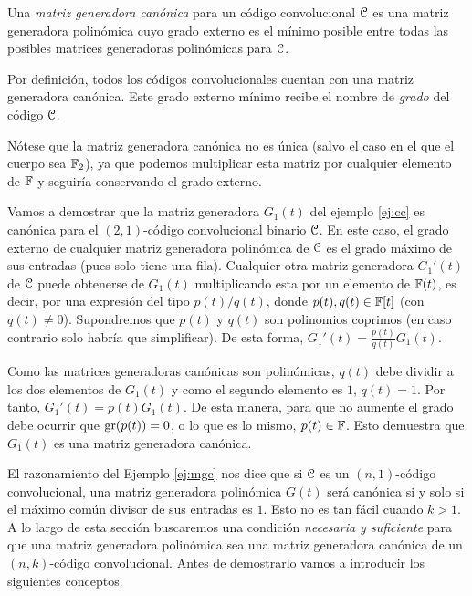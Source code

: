 \begin{definicion}
Una \emph{matriz generadora canónica} para un código convolucional $\mathcal C$ es una matriz generadora polinómica cuyo grado externo es el mínimo posible entre todas las posibles matrices generadoras polinómicas para $\mathcal C$.
\end{definicion}


Por definición, todos los códigos convolucionales cuentan con una matriz generadora canónica. Este grado externo mínimo recibe el nombre de \emph{grado} del código $\mathcal C$.

Nótese que la matriz generadora canónica no es única (salvo el caso en el que el cuerpo sea $\mathbb{F}_2$), ya que podemos multiplicar esta matriz por cualquier elemento de $\mathbb{F}$ y seguiría conservando el grado externo.

\begin{ejemplo}
\label{ej:mgc}
Vamos a demostrar que la matriz generadora $G_1(t)$ del ejemplo \ref{ej:cc} es canónica para el $(2,1)$-código convolucional binario $\mathcal C$. En este caso, el grado externo de cualquier matriz generadora polinómica de $\mathcal C$ es el grado máximo de sus entradas (pues solo tiene una fila). Cualquier otra matriz generadora $G_1'(t)$ de $\mathcal C$ puede obtenerse de $G_1(t)$ multiplicando esta por un elemento de $\mathbb{F}(t)$, es decir, por una expresión del tipo $p(t)/q(t)$, donde $p(t),q(t) \in \mathbb{F}[t]$ (con $q(t) \neq 0$). Supondremos que $p(t)$ y $q(t)$ son polinomios coprimos (en caso contrario solo habría que simplificar). De esta forma, $G_1'(t) = \frac{p(t)}{q(t)}G_1(t)$. 

Como las matrices generadoras canónicas son polinómicas, $q(t)$ debe dividir a los dos elementos de $G_1(t)$ y como el segundo elemento es $1$, $q(t) = 1$. Por tanto, $G_1'(t) = p(t)G_1(t)$. De esta manera, para que no aumente el grado debe ocurrir que $\operatorname{gr}(p(t)) = 0$, o lo que es lo mismo, $p(t) \in \mathbb{F}$. Esto demuestra que $G_1(t)$ es una matriz generadora canónica.
\end{ejemplo}

El razonamiento del Ejemplo \ref{ej:mgc} nos dice que si $\mathcal C$ es un $(n,1)$-código convolucional, una matriz generadora polinómica $G(t)$ será canónica si y solo si el máximo común divisor de sus entradas es $1$. Esto no es tan fácil cuando $k > 1$. A lo largo de esta sección buscaremos una condición \emph{necesaria y suficiente} para que una matriz generadora polinómica sea una matriz generadora canónica de un $(n,k)$-código convolucional. Antes de demostrarlo vamos a introducir los siguientes conceptos.

